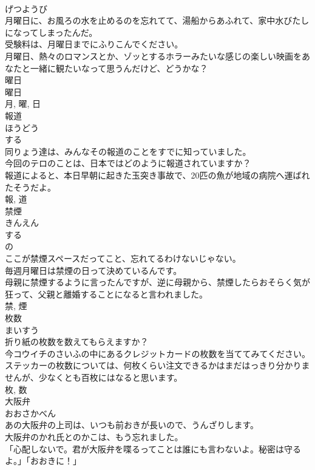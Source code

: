 \documentclass[8pt]{extreport}
\begin{document}
\begin{CJK}{UTF8}{min}
\\	げつようび	
\\	月曜日に、お風ろの水を止めるのを忘れてて、湯船からあふれて、家中水びたしになってしまったんだ。	
\\	受験料は、月曜日までにふりこんでください。	
\\	月曜日、熱々のロマンスとか、ゾッとするホラーみたいな感じの楽しい映画をあなたと一緒に観たいなって思うんだけど、どうかな？	
\\	曜日 
\\	曜日 
\\	月, 曜, 日	
\\	報道	
\\	ほうどう	
\\	する 
\\	同りょう達は、みんなその報道のことをすでに知っていました。	
\\	今回のテロのことは、日本ではどのように報道されていますか？	
\\	報道によると、本日早朝に起きた玉突き事故で、20匹の魚が地域の病院へ運ばれたそうだよ。	
\\	報, 道	
\\	禁煙	
\\	きんえん	
\\	する 
\\	の 
\\	ここが禁煙スペースだってこと、忘れてるわけないじゃない。	
\\	毎週月曜日は禁煙の日って決めているんです。	
\\	母親に禁煙するように言ったんですが、逆に母親から、禁煙したらおそらく気が狂って、父親と離婚することになると言われました。	
\\	禁, 煙	
\\	枚数	
\\	まいすう	
\\	折り紙の枚数を数えてもらえますか？	
\\	今コウイチのさいふの中にあるクレジットカードの枚数を当ててみてください。	
\\	ステッカーの枚数については、何枚くらい注文できるかはまだはっきり分かりませんが、少なくとも百枚にはなると思います。	
\\	枚, 数	
\\	大阪弁	
\\	おおさかべん	
\\	あの大阪弁の上司は、いつも前おきが長いので、うんざりします。	
\\	大阪弁のかれ氏とのかこは、もう忘れました。	
\\	「心配しないで。君が大阪弁を喋るってことは誰にも言わないよ。秘密は守るよ。」「おおきに！」	

\end{CJK}
\end{document}
